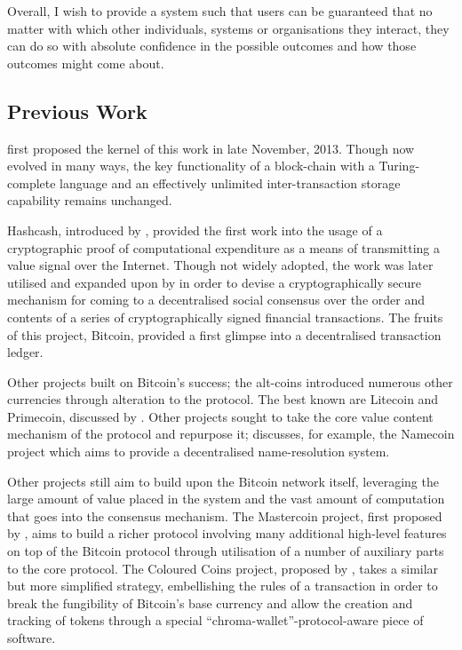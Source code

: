 \documentclass[9pt,oneside]{amsart}
\begin{document}
\begin{multicols}{2}
Overall, I wish to provide a system such that users can be guaranteed that no matter with which other individuals, systems or organisations they interact, they can do so with absolute confidence in the possible outcomes and how those outcomes might come about.

\subsection{Previous Work} \label{ch:previous}

\cite{buterin2013ethereum} first proposed the kernel of this work in late November, 2013. Though now evolved in many ways, the key functionality of a block-chain with a Turing-complete language and an effectively unlimited inter-transaction storage capability remains unchanged.

Hashcash, introduced by \cite{laurie2004proof}, provided the first work into the usage of a cryptographic proof of computational expenditure as a means of transmitting a value signal over the Internet. Though not widely adopted, the work was later utilised and expanded upon by \cite{nakamoto2008bitcoin} in order to devise a cryptographically secure mechanism for coming to a decentralised social consensus over the order and contents of a series of cryptographically signed financial transactions. The fruits of this project, Bitcoin, provided a first glimpse into a decentralised transaction ledger.

Other projects built on Bitcoin's success; the alt-coins introduced numerous other currencies through alteration to the protocol. The best known are Litecoin and Primecoin, discussed by \cite{sprankel2013technical}. Other projects sought to take the core value content mechanism of the protocol and repurpose it; \cite{aron2012bitcoin} discusses, for example, the Namecoin project which aims to provide a decentralised name-resolution system.

Other projects still aim to build upon the Bitcoin network itself, leveraging the large amount of value placed in the system and the vast amount of computation that goes into the consensus mechanism. The Mastercoin project, first proposed by \cite{mastercoin2013willett}, aims to build a richer protocol involving many additional high-level features on top of the Bitcoin protocol through utilisation of a number of auxiliary parts to the core protocol. The Coloured Coins project, proposed by \cite{colouredcoins2012rosenfeld}, takes a similar but more simplified strategy, embellishing the rules of a transaction in order to break the fungibility of Bitcoin's base currency and allow the creation and tracking of tokens through a special ``chroma-wallet''-protocol-aware piece of software.


\end{multicols}
\end{document}
